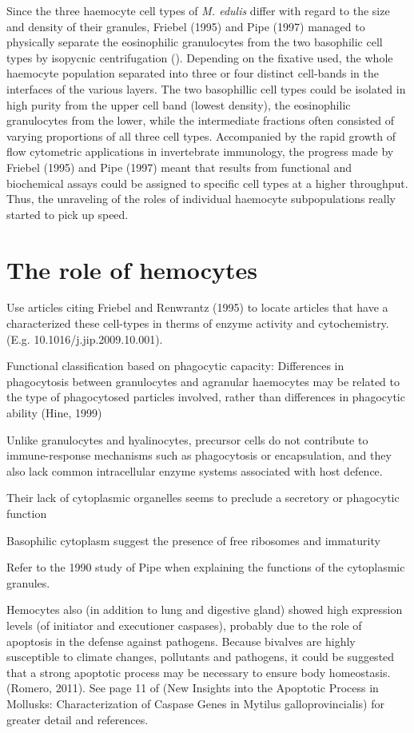 Since the three haemocyte cell types of \emph{M. edulis} differ with regard to the size and density of their granules, Friebel (1995) and Pipe (1997) managed to physically separate the eosinophilic granulocytes from the two basophilic cell types by isopycnic centrifugation (\cite{Friebel1995, Pipe1997}). Depending on the fixative used, the whole haemocyte population separated into three or four distinct cell-bands in the interfaces of the various layers. The two basophillic cell types could be isolated in high purity from the upper cell band (lowest density), the eosinophilic granulocytes from the lower, while the intermediate fractions often consisted of varying proportions of all three cell types. Accompanied by the rapid growth of flow cytometric applications in invertebrate immunology, the progress made by Friebel (1995) and Pipe (1997) meant that results from functional and biochemical assays could be assigned to specific cell types at a higher throughput. Thus, the unraveling of the roles of individual haemocyte subpopulations really started to pick up speed.

\section{The role of hemocytes}
Use articles citing Friebel and Renwrantz (1995) to locate articles that have a characterized these cell-types in therms of enzyme activity and cytochemistry. (E.g. 10.1016/j.jip.2009.10.001).

Functional classification based on phagocytic capacity: Differences in phagocytosis between granulocytes and agranular haemocytes may be related to the type of phagocytosed particles involved, rather than differences in phagocytic ability (Hine, 1999)

Unlike granulocytes and hyalinocytes, precursor cells do not contribute to immune-response mechanisms such as phagocytosis or encapsulation, and they also lack common intracellular enzyme systems associated with host defence. 

Their lack of cytoplasmic organelles seems to preclude a secretory or phagocytic function

Basophilic cytoplasm suggest the presence of free ribosomes and immaturity

Refer to the 1990 study of Pipe when explaining the functions of the cytoplasmic granules.

Hemocytes also (in addition to lung and digestive gland) showed high expression levels (of initiator and executioner caspases), probably due to the role of apoptosis in the defense against pathogens. Because bivalves are highly susceptible to climate changes, pollutants and pathogens, it  could be suggested that a strong apoptotic process may be necessary to ensure body homeostasis. (Romero, 2011). See page 11 of (New Insights into the Apoptotic Process in Mollusks: Characterization of Caspase Genes in Mytilus galloprovincialis) for greater detail and references.

